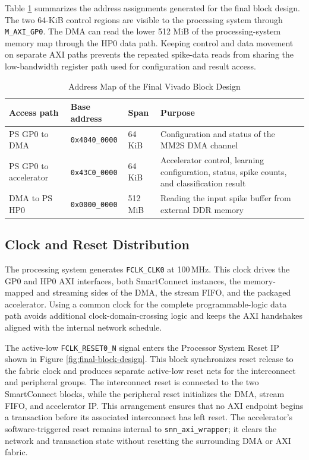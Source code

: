 Table \ref{tab:block-design-address-map} summarizes the address assignments generated for the final block design. The two 64-KiB control regions are visible to the processing system through \texttt{M\_AXI\_GP0}. The DMA can read the lower 512 MiB of the processing-system memory map through the HP0 data path. Keeping control and data movement on separate AXI paths prevents the repeated spike-data reads from sharing the low-bandwidth register path used for configuration and result access.

\begin{table}[htbp]
	\centering
	\caption{Address Map of the Final Vivado Block Design}
	\label{tab:block-design-address-map}
	\small
	\begin{tabularx}{\linewidth}{@{}l l l X@{}}
		\toprule
		\textbf{Access path} & \textbf{Base address} & \textbf{Span} & \textbf{Purpose} \\
		\midrule
		PS GP0 to DMA & \texttt{0x4040\_0000} & 64 KiB & Configuration and status of the MM2S DMA channel \\
		PS GP0 to accelerator & \texttt{0x43C0\_0000} & 64 KiB & Accelerator control, learning configuration, status, spike counts, and classification result \\
		DMA to PS HP0 & \texttt{0x0000\_0000} & 512 MiB & Reading the input spike buffer from external DDR memory \\
		\bottomrule
	\end{tabularx}
\end{table}

\subsection{Clock and Reset Distribution}

The processing system generates \texttt{FCLK\_CLK0} at 100\,MHz. This clock drives the GP0 and HP0 AXI interfaces, both SmartConnect instances, the memory-mapped and streaming sides of the DMA, the stream FIFO, and the packaged accelerator. Using a common clock for the complete programmable-logic data path avoids additional clock-domain-crossing logic and keeps the AXI handshakes aligned with the internal network schedule.

The active-low \texttt{FCLK\_RESET0\_N} signal enters the Processor System Reset IP shown in Figure \ref{fig:final-block-design}. This block synchronizes reset release to the fabric clock and produces separate active-low reset nets for the interconnect and peripheral groups. The interconnect reset is connected to the two SmartConnect blocks, while the peripheral reset initializes the DMA, stream FIFO, and accelerator IP. This arrangement ensures that no AXI endpoint begins a transaction before its associated interconnect has left reset. The accelerator's software-triggered reset remains internal to \texttt{snn\_axi\_wrapper}; it clears the network and transaction state without resetting the surrounding DMA or AXI fabric.

